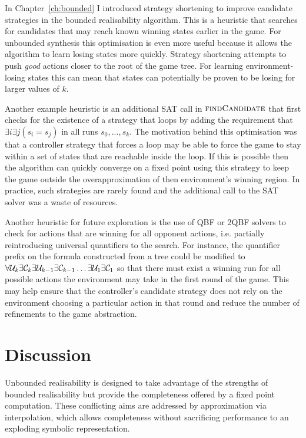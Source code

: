 In Chapter~\ref{ch:bounded} I introduced strategy shortening to improve candidate strategies in the bounded realisability algorithm. This is a heuristic that searches for candidates that may reach known winning states earlier in the game.  For unbounded synthesis this optimisation is even more useful because it allows the algorithm to learn losing states more quickly.  Strategy shortening attempts to push \emph{good} actions closer to the root of the game tree. For learning environment-losing states this can mean that states can potentially be proven to be losing for larger values of $k$. 

Another example heuristic is an additional SAT call in $\textsc{findCandidate}$ that first checks for the existence of a strategy that loops by adding the requirement that $\exists i \exists j (s_i = s_j)$ in all runs $s_0, ..., s_k$. The motivation behind this optimisation was that a controller strategy that forces a loop may be able to force the game to stay within a set of states that are reachable inside the loop. If this is possible then the algorithm can quickly converge on a fixed point using this strategy to keep the game outside the overapproximation of then environment's winning region.  In practice, such strategies are rarely found and the additional call to the SAT solver was a waste of resources. 

Another heuristic for future exploration is the use of QBF or 2QBF solvers to check for actions that are winning for all opponent actions, i.e. partially reintroducing universal quantifiers to the search. For instance, the quantifier prefix on the formula constructed from a tree could be modified to $\forall \mathcal{U}_k \exists \mathcal{C}_k \exists \mathcal{U}_{k-1} \exists \mathcal{C}_{k-1} \ldots \exists \mathcal{U}_1 \exists \mathcal{C}_1$ so that there must exist a winning run for all possible actions the environment may take in the first round of the game. This may help ensure that the controller's candidate strategy does not rely on the environment choosing a particular action in that round and reduce the number of refinements to the game abstraction.

\section{Discussion}

Unbounded realisability is designed to take advantage of the strengths of bounded realisability but provide the completeness offered by a fixed point computation. These conflicting aims are addressed by approximation via interpolation, which allows completeness without sacrificing performance to an exploding symbolic representation.

